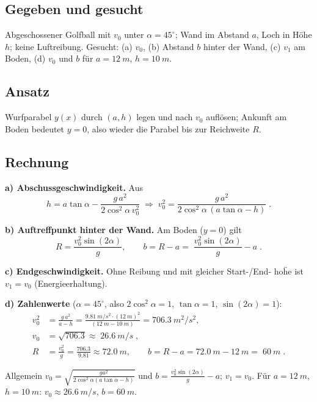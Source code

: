 
\subsection*{Gegeben und gesucht}
Abgeschossener Golfball mit $v_0$ unter $\alpha=45^\circ$; Wand im Abstand
$a$, Loch in H\"ohe $h$; keine Luftreibung. Gesucht: (a) $v_0$, (b) Abstand
$b$ hinter der Wand, (c) $v_1$ am Boden, (d) $v_0$ und $b$ f\"ur
$a=\qty{12}{m}$, $h=\qty{10}{m}$.

\subsection*{Ansatz}
Wurfparabel $y(x)$ durch $(a,h)$ legen und nach $v_0$ aufl\"osen;
Ankunft am Boden bedeutet $y=0$, also wieder die Parabel bis zur
Reichweite $R$.

\subsection*{Rechnung}
\textbf{a) Abschussgeschwindigkeit.} Aus
\begin{equation}
  h=a\tan\alpha-\frac{g\,a^2}{2\cos^2\alpha\,v_0^2}
  \;\Rightarrow\;
  v_0^2=\frac{g\,a^2}{2\cos^2\alpha\,(a\tan\alpha-h)}\;.
\end{equation}

\textbf{b) Auftreffpunkt hinter der Wand.} Am Boden ($y=0$) gilt
\begin{equation}
  R=\frac{v_0^2\sin(2\alpha)}{g},\qquad
  b=R-a=\boxed{\;\frac{v_0^2\sin(2\alpha)}{g}-a\;}.
\end{equation}

\textbf{c) Endgeschwindigkeit.} Ohne Reibung und mit gleicher Start-/End-
ho\"he ist $v_1=v_0$ (Energieerhaltung).

\textbf{d) Zahlenwerte} ($\alpha=45^\circ$, also $2\cos^2\alpha=1$,
$\tan\alpha=1$, $\sin(2\alpha)=1$):
\begin{align}
  v_0^2&=\frac{g\,a^2}{a-h}
       =\frac{\qty{9.81}{m/s^2}\cdot(\qty{12}{m})^2}{(\qty{12}{m}-\qty{10}{m})}
       =\qty{706.3}{m^2/s^2},\\
  v_0&=\sqrt{706.3}\approx\boxed{\;\qty{26.6}{m/s}\;},\\
  R&=\frac{v_0^2}{g}=\frac{706.3}{9.81}\approx\qty{72.0}{m},\qquad
  b=R-a=\qty{72.0}{m}-\qty{12}{m}=\boxed{\;\qty{60}{m}\;}.
\end{align}

\begin{ergebnis}
Allgemein $v_0=\sqrt{\frac{g a^2}{2\cos^2\alpha(a\tan\alpha-h)}}$ und
$b=\frac{v_0^2\sin(2\alpha)}{g}-a$; $v_1=v_0$. F\"ur $a=\qty{12}{m}$,
$h=\qty{10}{m}$: $v_0\approx\qty{26.6}{m/s}$, $b=\qty{60}{m}$.
\end{ergebnis}

